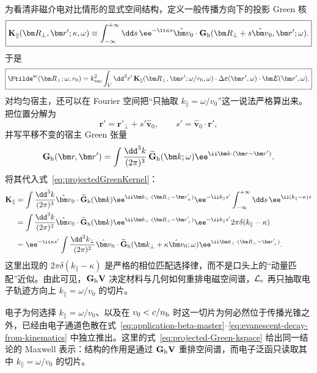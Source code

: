 为看清非磁介电对比情形的显式空间结构，定义一般传播方向下的投影 Green 核
\begin{equation}
\boxed{
\mathbf K_{\parallel}(\bm R_\perp,\bm r';\kappa,\omega)
\equiv
\int_{-\infty}^{+\infty}\dd s\,
\ee^{-\ii\kappa s}
\hat{\bm v}_0\cdot
\mathbf G_{\rm h}(\bm R_\perp+s\hat{\bm v}_0,\bm r';\omega).}
\label{eq:projectedGreenKernel}
\end{equation}
于是
\begin{equation}
\boxed{
\Ftilde^{\rm sc}(\bm R_\perp;\omega,v_0)
=k_{\rm vac}^2\int_V\dd^3r'\,
\mathbf K_{\parallel}(\bm R_\perp,\bm r';\omega/v_0,\omega)
\cdot\Delta\boldsymbol\varepsilon(\bm r',\omega)
\cdot\bm E(\bm r',\omega).}
\label{eq:general_green_PINEM}
\end{equation}
对均匀宿主，还可以在 Fourier 空间把“只抽取 $k_\parallel=\omega/v_0$”这一说法严格算出来。把位置分解为
\begin{equation}
\bm r'=\bm r'_\perp+s'\hat{\bm v}_0,
\qquad s'=\hat{\bm v}_0\cdot\bm r',
\end{equation}
并写平移不变的宿主 Green 张量
\begin{equation}
\mathbf G_{\rm h}(\bm r,\bm r')
=\int\frac{\dd^3k}{(2\pi)^3}\,
\widetilde{\mathbf G}_{\rm h}(\bm k;\omega)
\ee^{\ii\bm k\cdot(\bm r-\bm r')}.
\end{equation}
将其代入式~\eqref{eq:projectedGreenKernel}：
\begin{align}
\mathbf K_\parallel
&=\int\frac{\dd^3k}{(2\pi)^3}
\hat{\bm v}_0\cdot\widetilde{\mathbf G}_{\rm h}(\bm k)
\ee^{\ii\bm k_\perp\cdot(\bm R_\perp-\bm r'_\perp)}
\ee^{-\ii k_\parallel s'}
\int_{-\infty}^{+\infty}\dd s\,
\ee^{\ii(k_\parallel-\kappa)s}\\
&=\int\frac{\dd^3k}{(2\pi)^3}
\hat{\bm v}_0\cdot\widetilde{\mathbf G}_{\rm h}(\bm k)
\ee^{\ii\bm k_\perp\cdot(\bm R_\perp-\bm r'_\perp)}
\ee^{-\ii k_\parallel s'}
2\pi\delta(k_\parallel-\kappa)\\
&=\ee^{-\ii\kappa s'}
\int\frac{\dd^2k_\perp}{(2\pi)^2}
\hat{\bm v}_0\cdot
\widetilde{\mathbf G}_{\rm h}(\bm k_\perp+\kappa\hat{\bm v}_0;\omega)
\ee^{\ii\bm k_\perp\cdot(\bm R_\perp-\bm r'_\perp)}.
\label{eq:projected-Green-kspace}
\end{align}
这里出现的 $2\pi\delta(k_\parallel-\kappa)$ 是严格的相位匹配选择律，而不是口头上的“动量匹配”近似。由此可见，$\mathbf G_{\rm h}\mathbf V$ 决定材料与几何如何重排电磁空间谱，$\mathcal L_{\rm e}$ 再只抽取电子轨迹方向上 $k_{\parallel}=\omega/v_0$ 的切片。


电子为何选择 $k_\parallel=\omega/v_0$、以及在 $v_0<c/n_{\rm h}$ 时这一切片为何必然位于传播光锥之外，已经由电子通道色散在式~\eqref{eq:application-beta-master}--\eqref{eq:evanescent-decay-from-kinematics} 中独立推出。这里的式~\eqref{eq:projected-Green-kspace} 给出同一结论的 Maxwell 表示：结构的作用是通过 $\mathbf G_{\rm h}\mathbf V$ 重排空间谱，而电子泛函只读取其中 $k_\parallel=\omega/v_0$ 的切片。


